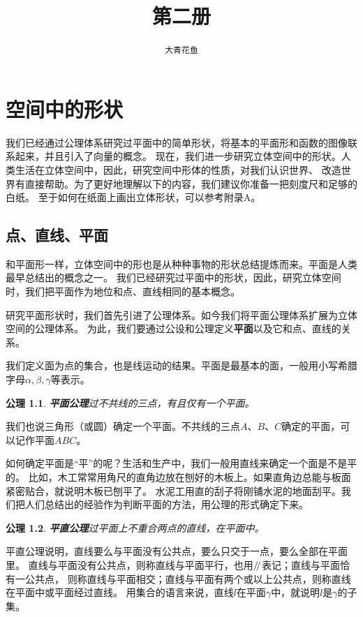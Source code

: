 \documentclass[12pt,UTF8]{ctexbook}
\title{\zihao{0} \bfseries 第二册}
\author{\zihao{2} \texttt{大青花鱼}}
\date{}
\newtheorem{po}{公理}
\renewcommand\parallel{\mathrel{/\mskip-4mu/}}
\begin{document}
\maketitle
\tableofcontents
\newpage

\chapter{空间中的形状}

我们已经通过公理体系研究过平面中的简单形状，将基本的平面形和函数的图像联系起来，并且引入了向量的概念。
现在，我们进一步研究立体空间中的形状。人类生活在立体空间中，因此，研究空间中形体的性质，对我们认识世界、
改造世界有直接帮助。为了更好地理解以下的内容，我们建议你准备一把刻度尺和足够的白纸。
至于如何在纸面上画出立体形状，可以参考附录A。

\section{点、直线、平面}

和平面形一样，立体空间中的形也是从种种事物的形状总结提炼而来。平面是人类最早总结出的概念之一。
我们已经研究过平面中的形状，因此，研究立体空间时，我们把平面作为地位和点、直线相同的基本概念。

研究平面形状时，我们首先引进了公理体系。如今我们将平面公理体系扩展为立体空间的公理体系。
为此，我们要通过公设和公理定义\textbf{平面}以及它和点、直线的关系。

我们定义面为点的集合，也是线运动的结果。平面是最基本的面，一般用小写希腊字母$\alpha,\beta,\gamma$等表示。
\begin{po}{\textbf{平面公理}}\label{po:0}
    过不共线的三点，有且仅有一个平面。
\end{po}

我们也说三角形（或圆）确定一个平面。不共线的三点$A$、$B$、$C$确定的平面，可以记作平面$ABC$。

如何确定平面是“平”的呢？生活和生产中，我们一般用直线来确定一个面是不是平的。
比如，木工常常用角尺的直角边放在刨好的木板上。如果直角边总能与板面紧密贴合，就说明木板已刨平了。
水泥工用直的刮子将刚铺水泥的地面刮平。我们把人们总结出的经验作为判断平面的方法，用公理的形式确定下来。
\begin{po}{\textbf{平直公理}}\label{po:1}
    过平面上不重合两点的直线，在平面中。
\end{po}
平直公理说明，直线要么与平面没有公共点，要么只交于一点，要么全部在平面里。
直线与平面没有公共点，则称直线与平面平行，也用$\parallel$表记；直线与平面恰有一公共点，
则称直线与平面相交；直线与平面有两个或以上公共点，则称直线在平面中或平面经过直线。
用集合的语言来说，直线$l$在平面$\gamma$中，就说明$l$是$\gamma$的子集。
\end{document}
